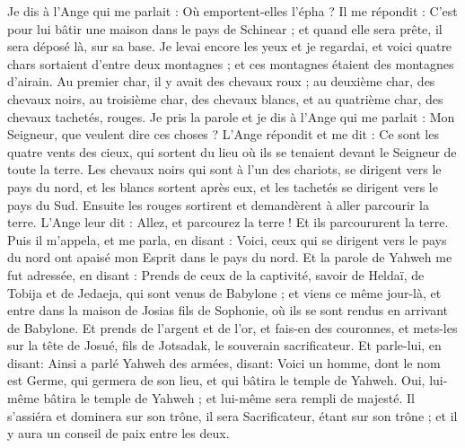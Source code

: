 \begin{multicols}{2}
Je dis à l'Ange qui me parlait : Où emportent-elles l'épha ?
Il me répondit : C'est pour lui bâtir une maison dans le pays de Schinear ; et quand elle sera prête, il sera déposé là, sur sa base.
\VerseOne{}Je levai encore les yeux et je regardai, et voici quatre chars sortaient d'entre deux montagnes ; et ces montagnes étaient des montagnes d'airain.
Au premier char, il y avait des chevaux roux ; au deuxième char, des chevaux noirs,
au troisième char, des chevaux blancs, et au quatrième char, des chevaux tachetés, rouges.
Je pris la parole et je dis à l'Ange qui me parlait : Mon Seigneur, que veulent dire ces choses ?
L'Ange répondit et me dit : Ce sont les quatre vents des cieux, qui sortent du lieu où ils se tenaient devant le Seigneur de toute la terre.
Les chevaux noirs qui sont à l’un des chariots, se dirigent vers le pays du nord, et les blancs sortent après eux, et les tachetés se dirigent vers le pays du Sud.
Ensuite les rouges sortirent et demandèrent à aller parcourir la terre. L'Ange leur dit : Allez, et parcourez la terre ! Et ils parcoururent la terre.
Puis il m'appela, et me parla, en disant : Voici, ceux qui se dirigent vers le pays du nord ont apaisé mon Esprit dans le pays du nord.
Et la parole de Yahweh me fut adressée, en disant :
Prends de ceux de la captivité, savoir de Heldaï, de Tobija et de Jedaeja, qui sont venus de Babylone ; et viens ce même jour-là, et entre dans la maison de Josias fils de Sophonie, où ils se sont rendus en arrivant de Babylone.
 Et prends de l'argent et de l'or, et fais-en des couronnes, et mets-les sur la tête de Josué, fils de Jotsadak, le souverain sacrificateur.
 Et parle-lui, en disant: Ainsi a parlé Yahweh des armées, disant: Voici un homme, dont le nom est Germe, qui germera de son lieu, et qui bâtira le temple de Yahweh.
Oui, lui-même bâtira le temple de Yahweh ; et lui-même sera rempli de majesté. Il s'assiéra et dominera sur son trône, il sera Sacrificateur, étant sur son trône ; et il y aura un conseil de paix entre les deux.

\end{multicols}
